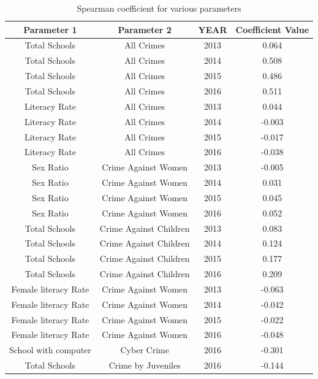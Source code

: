 \documentclass[twoside]{article}
\begin{document}
\begin{table}[h!]
\centering
\begin{tabular}{||c c c c||} 
 \hline
 Parameter 1 & Parameter 2 & YEAR & Coefficient Value \\ [0.5ex] 
 \hline\hline
 Total Schools & All Crimes & 2013 & 0.064 \\ 
 Total Schools & All Crimes & 2014 & 0.508 \\ 
 Total Schools & All Crimes & 2015 & 0.486 \\ 
 Total Schools & All Crimes & 2016 & 0.511 \\ 
 
 Literacy Rate & All Crimes & 2013 & 0.044 \\ 
 Literacy Rate & All Crimes & 2014 & -0.003 \\ 
 Literacy Rate & All Crimes & 2015 & -0.017 \\ 
 Literacy Rate & All Crimes & 2016 & -0.038 \\ 
 
 Sex Ratio & Crime Against Women & 2013 & -0.005 \\ 
 Sex Ratio & Crime Against Women & 2014 & 0.031 \\ 
 Sex Ratio & Crime Against Women & 2015 & 0.045 \\ 
 Sex Ratio & Crime Against Women & 2016 & 0.052 \\ 
 
 Total Schools & Crime Against Children & 2013 & 0.083 \\ 
 Total Schools & Crime Against Children & 2014 & 0.124 \\ 
 Total Schools & Crime Against Children & 2015 & 0.177 \\ 
 Total Schools & Crime Against Children & 2016 & 0.209 \\
 
 Female literacy Rate & Crime Against Women & 2013 & -0.063 \\ 
 Female literacy Rate & Crime Against Women & 2014 & -0.042 \\ 
 Female literacy Rate & Crime Against Women & 2015 & -0.022 \\ 
 Female literacy Rate & Crime Against Women & 2016 & -0.048 \\
 School with computer & Cyber Crime & 2016 & -0.301 \\
 Total Schools & Crime by Juveniles & 2016 & -0.144 \\ [1ex] 
 \hline
\end{tabular}
\caption{Spearman coefficient for various parameters}
\label{tab:spearman_coefficient}
\end{table}
\end{document}
